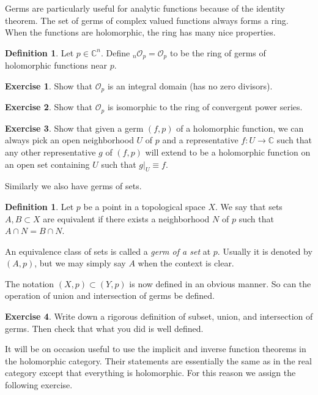\documentclass[12pt,openany]{book}
\newcommand{\C}{{\mathbb{C}}}
\newcommand{\sO}{{\mathcal{O}}}
\newcommand{\myindex}[1]{#1\index{#1}}
\theoremstyle{plain}
\theoremstyle{remark}
\theoremstyle{definition}
\newtheorem{defn}[thm]{Definition}
\theoremstyle{exercise}
\newtheorem{exercise}{Exercise}[section]
\theoremstyle{example}
\begin{document}
Germs are particularly useful for analytic functions because of the identity
theorem.  The set of germs of complex valued functions always forms a ring.
When the functions are holomorphic, the ring has many nice properties.

\begin{defn}
Let $p \in \C^n$.  Define
${}_n\sO_p = \sO_p$ to be the ring of germs of holomorphic functions near $p$.
\end{defn}

\begin{exercise}
Show that $\sO_p$ is an integral domain (has no zero divisors).
\end{exercise}

\begin{exercise}
Show that $\sO_p$ is isomorphic to the ring of convergent power series.
\end{exercise}

\begin{exercise}
Show that given a germ $(f,p)$ of a holomorphic function,
we can always pick an open neighborhood $U$
of $p$ and a representative $f \colon U \to \C$ such that any other
representative $g$
of $(f,p)$ will extend to be a holomorphic function on an open set containing
$U$ such that $g|_U \equiv f$.
\end{exercise}

Similarly we also have germs of sets.

\begin{defn}
Let $p$ be a point in a topological space $X$.
We say that sets $A, B \subset X$ are equivalent
if there exists a neighborhood $N$ of $p$
such that $A \cap N = B \cap N$.

An equivalence class of sets 
is called a \emph{\myindex{germ of a set}} at $p$.
Usually it is denoted by $(A,p)$, but we may simply say $A$ when
the context is clear.
\end{defn}

The notation $(X,p) \subset (Y,p)$ is now defined in an obvious manner.
So can the operation of union and intersection of germs be defined.

\begin{exercise}
Write down a rigorous definition of subset, union, and intersection of germs.
Then check that what you did is well defined.
\end{exercise}

It will be on occasion useful to use the implicit and inverse function
theorems in the holomorphic category.  Their statements are essentially the
same as in the real category except that everything is holomorphic.  For this
reason we assign the following exercise.
\end{document}
